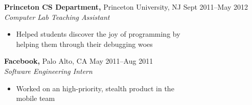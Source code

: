 \documentclass[margin]{res}
\begin{document}
\begin{resume}
 {\bf Princeton CS Department,} Princeton University, NJ \hfill Sept 2011--May 2012 \\
 {\it Computer Lab Teaching Assistant}
 \begin{itemize} \itemsep -2pt  %
 \item Helped students discover the joy of programming by \\
   helping them through their debugging woes
 \end{itemize}

 {\bf Facebook,} Palo Alto, CA \hfill May 2011--Aug 2011 \\
 {\it Software Engineering Intern}
 \begin{itemize} \itemsep -2pt  %
 \item Worked on an high-priority, stealth product in the \\
   mobile team
 \end{itemize}





\end{resume}
\end{document}
